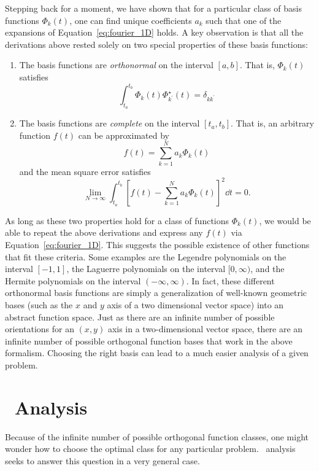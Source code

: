 Stepping back for a moment, we have shown that for a particular
class of basis functions $\Phi_k(t)$, one can find unique coefficients
$a_k$ such that one of the expansions of Equation~\ref{eq:fourier_1D} holds.
A key observation is that all the derivations above rested 
solely on two special properties of these basis functions:
\begin{enumerate}
  \item
    The basis functions are {\it orthonormal} on the interval $[a, b]$.
    That is, $\Phi_k(t)$ satisfies
    \begin{equation}
      \int_{t_a}^{t_b} \Phi_k(t) \Phi^\star_{k^\prime}(t) = \delta_{kk^\prime}
    \end{equation}
  \item
    The basis functions are {\it complete} on the interval $[t_a, t_b]$.
    That is, an arbitrary function $f(t)$ can be approximated by
    \begin{equation}
      f(t) = \sum_{k=1}^N a_k \Phi_k(t)
    \end{equation}
    and the mean square error satisfies
    \begin{equation}
      \label{eq:completeness}
      \lim_{N\to\infty} \int_{t_a}^{t_b}
      \left[f(t) - \sum_{k=1}^{N}a_k \Phi_k(t)\right]^2 \dd t = 0.
    \end{equation}
\end{enumerate}
As long as these two properties hold for a class of functions $\Phi_k(t)$,
we would be able to repeat the above derivations and express any $f(t)$
via Equation~\ref{eq:fourier_1D}.
This suggests the possible existence of other functions that fit these
criteria.  Some examples are the Legendre polynomials on the interval
$[-1, 1]$, the Laguerre polynomials on the interval $[0, \infty)$, and
the Hermite polynomials on the interval $(-\infty, \infty)$.
In fact, these different orthonormal basis functions are simply a
generalization of well-known geometric bases (such as the $x$ and $y$ axis
of a two dimensional vector space) into an abstract function space.
Just as there are an infinite number of possible orientations for
an $(x, y)$ axis in a two-dimensional vector space, there are an infinite
number of possible orthogonal function bases that work in the above
formalism.  Choosing the right basis can lead to a much easier analysis of
a given problem.

\section{\KL\ Analysis}
Because of the infinite number of possible orthogonal function classes,
one might wonder how to choose the optimal class for any particular problem.
\KL\ analysis seeks to answer this question in a very general case.

